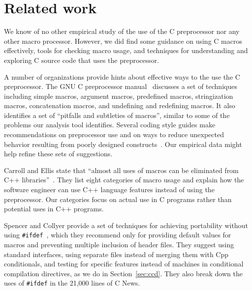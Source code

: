 \documentclass[10pt]{article}
\begin{document}
\section{Related work}
\label{sec:related}


We know of no other empirical study of the use of the C preprocessor
nor any other macro processor.  However, we did find some guidance on
using C macros effectively, tools for checking macro usage, and
techniques for understanding and exploring C source code that uses the
preprocessor.

A number of organizations provide hints about effective ways to the use the
C preprocessor.  The GNU C preprocessor manual~\cite{cpp-manual} discusses
a set of techniques including simple macros, argument macros, predefined
macros, stringization macros, concatenation macros, and undefining and
redefining macros.  It also identifies a set of ``pitfalls and subtleties
of macros'', similar to some of the problems our analysis tool
identifies.  Several coding style guides make recommendations on
preprocessor use and on ways to reduce unexpected behavior resulting from
poorly designed constructs~\cite{Stallman97,ellemtel92,Cannon95,Dolenc90}.
Our empirical data might help refine these sets of suggestions.

Carroll and Ellis state that ``almost all uses of macros can be eliminated
from C++ libraries''~\cite[p.~146]{Carroll95}.  They list eight categories
of macro usage and explain how the software engineer can use C++ language
features instead of using the preprocessor.  Our categories focus on actual
use in C programs rather than potential uses in C++ programs.

Spencer and Collyer provide a set of techniques for achieving portability
without using \texttt{\#ifdef}~\cite{SpencerC92}, which they recommend only
for providing default values for macros and preventing multiple inclusion
of header files.  They suggest using standard interfaces, using separate
files instead of merging them with Cpp conditionals, and testing for
specific features instead of machines in conditional compilation
directives, as we do in Section~\ref{sec:ccd}.  They also break down the
uses of \texttt{\#ifdef} in the 21,000 lines of C News.
\end{document}

